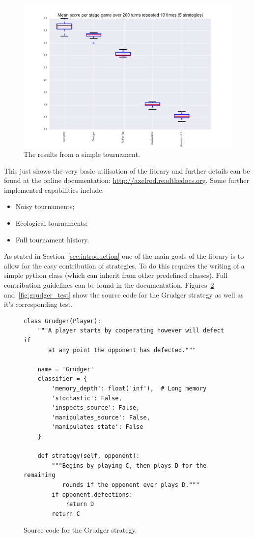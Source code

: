 \documentclass{article}
\begin{document}
\begin{figure}[!hbtp]
    \centering
    \includegraphics[width=.8\textwidth]{../img/demo_tournament.pdf}
    \caption{The results from a simple tournament.}
    \label{fig:demo_tournament}
\end{figure}

This just shows the very basic utilisation of the library and further details
can be found at the online documentation:
\url{http://axelrod.readthedocs.org}. Some further implemented capabilities include:

\begin{itemize}
    \item Noisy tournaments;
    \item Ecological tournaments;
    \item Full tournament history.
\end{itemize}

As stated in Section~\ref{sec:introduction} one of the main goals of the library
is to allow for the easy contribution of strategies. To do this requires the
writing of a simple python class (which can inherit from other predefined
classes). Full contribution guidelines can be found in the documentation.
Figures~\ref{fig:grudger} and~\ref{fig:grudger_test} show the source code for
the Grudger strategy as well as it's corresponding test.

\begin{figure}[!hbtp]
    \begin{lstlisting}[frame=single]
class Grudger(Player):
    """A player starts by cooperating however will defect if
       at any point the opponent has defected."""

    name = 'Grudger'
    classifier = {
        'memory_depth': float('inf'),  # Long memory
        'stochastic': False,
        'inspects_source': False,
        'manipulates_source': False,
        'manipulates_state': False
    }

    def strategy(self, opponent):
        """Begins by playing C, then plays D for the remaining
           rounds if the opponent ever plays D."""
        if opponent.defections:
            return D
        return C
    \end{lstlisting}
    \caption{Source code for the Grudger strategy.}
    \label{fig:grudger}
\end{figure}
\end{document}
